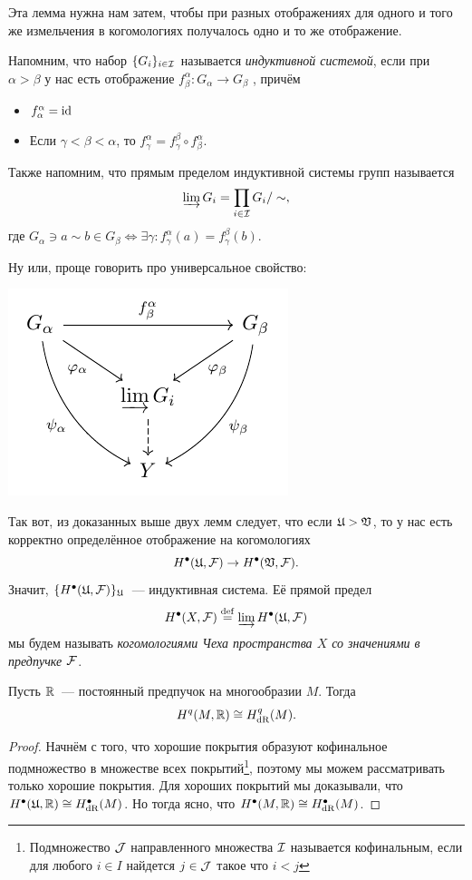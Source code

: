 	Эта лемма нужна нам затем, чтобы при разных отображениях для одного и того же измельчения в когомологиях получалось одно и то же отображение. 

	Напомним, что набор $\{ G_{i} \}_{i \in \mathcal{I}}$ называется \emph{индуктивной системой}, если при $\alpha > \beta$ у нас есть отображение $f_{\beta}^{\alpha}\colon G_{\alpha} \to G_{\beta}$ , причём 
	\begin{itemize}
		\item $f_{\alpha}^{\alpha} = \operatorname{id}$

		\item Если $\gamma < \beta < \alpha$, то $f_{\gamma}^{\alpha} = f_{\gamma}^{\beta} \circ f_{\beta}^{\alpha}$. 
	\end{itemize}

	Также напомним, что прямым пределом индуктивной системы групп называется 
	\[
		\varinjlim G_{i} = \prod_{i \in \mathcal{I}} G_{i}/\sim,
	\]
	где $G_{\alpha} \ni a \sim b \in G_{\beta} \Leftrightarrow \exists \gamma\colon f_{\gamma}^{\alpha}(a) = f_{\gamma}^{\beta}(b)$.

	Ну или, проще говорить про универсальное свойство: 

	\begin{center}
		\includegraphics{lectures/7/pictures/cd_43.pdf}
	\end{center}

	Так вот, из доказанных выше двух лемм следует, что если $\mathfrak{U} > \mathfrak{V}$, то у нас есть корректно определённое отображение на когомологиях 
	\[
		H^{\bullet}(\mathfrak{U}, \mathcal{F}) \to H^{\bullet}(\mathfrak{V}, \mathcal{F}).
	\]
	Значит, $\{ H^{\bullet}(\mathfrak{U}, \mathcal{F}) \}_{\mathfrak{U}}$~--- индуктивная система. Её прямой предел 
	\[
		H^{\bullet}(X, \mathcal{F}) \stackrel{\mathrm{def}}{=} \varinjlim H^{\bullet}(\mathfrak{U}, \mathcal{F})
	\]
	мы будем называть \emph{когомологиями Чеха пространства $X$ со значениями в предпучке $\mathcal{F}$}.

	\begin{lemma} 
		Пусть $\mathbb{R}$~--- постоянный предпучок на многообразии $M$. Тогда 
		\[
			H^{q}(M, \mathbb{R}) \cong H^{q}_{\operatorname{dR}}(M).
		\]
	\end{lemma}
	\begin{proof}
		 Начнём с того, что хорошие покрытия образуют кофинальное подмножество в множестве всех покрытий\footnote{Подмножество $\mathcal{J}$ направленного множества $\mathcal{I}$ называется кофинальным, если для любого $i \in I$ найдется $j \in \mathcal{J}$ такое что $i < j$}, поэтому мы можем рассматривать только хорошие покрытия. Для хороших покрытий мы доказывали, что $H^{\bullet}(\mathfrak{U}, \mathbb{R}) \cong H^{\bullet}_{\operatorname{dR}}(M)$. Но тогда ясно, что $H^{\bullet}(M, \mathbb{R}) \cong H^{\bullet}_{\operatorname{dR}}(M)$.                          
	\end{proof}

 



